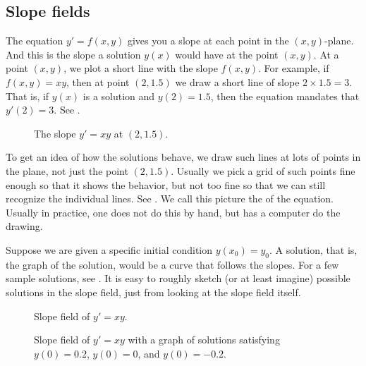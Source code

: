 \documentclass[12pt]{book}
\begin{document}
\subsection{Slope fields}

The equation $y' = f(x,y)$
gives you a slope at each point 
in the
$(x,y)$-plane.  And this is the slope a solution $y(x)$ would have at the
point $(x,y)$.  At a point $(x,y)$, we plot a short line
with the slope $f(x,y)$.
For example, if $f(x,y) = xy$, then at point $(2,1.5)$ we draw a
short line of slope $2 \times 1.5 = 3$.  That is, if $y(x)$ is a solution
and $y(2) = 1.5$, then the equation mandates that $y'(2) = 3$.
See .

\begin{figure}[h!t]
\begin{center}
\capstart
{}
\caption{The slope $y'=xy$ at $(2,1.5)$.\label{1.3:fig0}}
\end{center}
\end{figure}

To get an idea of how the solutions behave, we draw such lines at lots
of points in the plane, not just the point $(2,1.5)$.  Usually we pick a
grid of such points fine enough so that it shows the behavior, but not too
fine so that we can still recognize the individual lines.
See .
We call this picture the \emph{} of the equation.
Usually in practice, one does not do this by hand, but has a computer do the
drawing.

Suppose we are given a specific initial condition $y(x_0) = y_0$.
A solution, that is, the graph of the solution, would be a curve
that follows the slopes.  For a few sample
solutions, see .  It is easy to roughly sketch (or at
least imagine)
possible solutions in the slope field, just from looking at the slope field
itself.

\begin{figure}[h!t]
\begin{center}
\parbox[t]{3.1in}{
 \capstart
 \caption{Slope field of $y' = xy$.\label{1.3:fig1}}
}
\quad
\parbox[t]{3.1in}{
 \capstart
 \caption{Slope field of $y' = xy$ with a graph of solutions satisfying
 $y(0) = 0.2$, $y(0) = 0$, and $y(0) = -0.2$.\label{1.3:fig2}}
}
\end{center}
\end{figure}
\end{document}
